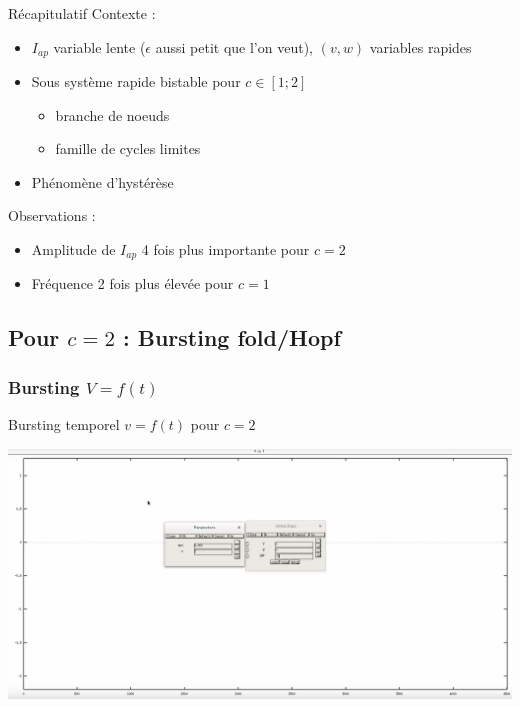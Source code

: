 \documentclass[xcolor={dvipsnames},10pt]{beamer}
\begin{document}
\begin{frame}{Récapitulatif}
Contexte :
\begin{itemize}
\item $I_{ap}$ variable lente ($\epsilon$ aussi petit que l'on veut), $(v, w)$ variables rapides
\item Sous système rapide bistable pour $c \in [1 ; 2]$
\begin{itemize}
\item branche de noeuds
\item famille de cycles limites
\end{itemize}
\item Phénomène d'hystérèse
\end{itemize}
Observations :
\begin{itemize}
\item Amplitude de $I_{ap}$ 4 fois plus importante pour $c = 2$
\item Fréquence 2 fois plus élevée pour $c = 1$
\end{itemize}
\end{frame}

\subsection{Pour \texorpdfstring{$c = 2$}{Lg} : Bursting fold/Hopf}

\subsubsection*{Bursting \texorpdfstring{$V=f(t)$}{Lg}}

\begin{frame}{Bursting temporel $v=f(t)$ pour $c = 2$}
\begin{center}
\href{https://drive.google.com/open?id=0ByPBcq8q0ou_c0xJOVRmR2JHd2M}{\includegraphics[width =  1.0\textwidth]{Burst_c_2_temp}}
\end{center}
\end{frame}
\end{document}
